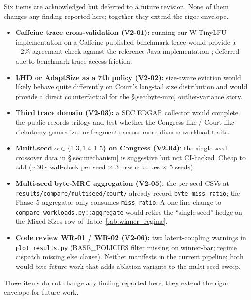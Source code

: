 Six items are acknowledged but deferred to a future revision. None of them
changes any finding reported here; together they extend the rigor envelope.

\begin{itemize}\setlength{\itemsep}{2pt}
  \item \textbf{Caffeine trace cross-validation (V2-01):} running our
  W-TinyLFU implementation on a Caffeine-published benchmark trace would
  provide a $\pm 2\%$ agreement check against the reference Java
  implementation \cite{caffeine2024}; deferred due to benchmark-trace access
  friction.
  \item \textbf{LHD or AdaptSize as a 7th policy (V2-02):} size-aware
  eviction would likely behave quite differently on Court's long-tail size
  distribution and would provide a direct counterfactual for the
  \S\ref{sec:byte-mrc} outlier-variance story.
  \item \textbf{Third trace domain (V2-03):} a SEC EDGAR collector would
  complete the public-records trilogy and test whether the Congress-like /
  Court-like dichotomy generalizes or fragments across more diverse
  workload traits.
  \item \textbf{Multi-seed $\alpha \in \{1.3, 1.4, 1.5\}$ on Congress
  (V2-04):} the single-seed crossover data in \S\ref{sec:mechanism} is
  suggestive but not CI-backed. Cheap to add ($\sim 30$\,s wall-clock per
  seed $\times$ 3 new $\alpha$ values $\times$ 5 seeds).
  \item \textbf{Multi-seed byte-MRC aggregation (V2-05):} the per-seed CSVs
  at \texttt{results/compare/multiseed/court/} already record
  \texttt{byte\_miss\_ratio}; the Phase~5 aggregator only consumes
  \texttt{miss\_ratio}. A one-line change to
  \texttt{compare\_workloads.py::aggregate} would retire the
  ``single-seed'' hedge on the Mixed Sizes row of
  Table~\ref{tab:winner_regime}.
  \item \textbf{Code review WR-01 / WR-02 (V2-06):} two latent-coupling
  warnings in \texttt{plot\_results.py} (BASE\_POLICIES filter missing on
  winner-bar; regime dispatch missing else clause). Neither manifests in
  the current pipeline; both would bite future work that adds ablation
  variants to the multi-seed sweep.
\end{itemize}

These items do not change any finding reported here; they extend the rigor
envelope for future work.
